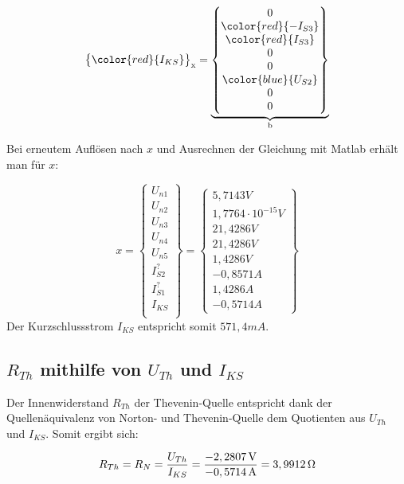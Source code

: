 \documentclass[11pt]{scrartcl}
\begin{document}
\begin{align*}
{\begin{Bmatrix}
                                                                             \color{red}{I_{KS}}
                                                                           \end{Bmatrix}}_{\text{x}} =
  \underbrace{\begin{Bmatrix}
      0 \\
      \color{red}{-I_{S3}} \\
      \color{red}{I_{S3}}\\
      0 \\
      0 \\
      \color{blue}{U_{S2}} \\
      0 \\
      0
    \end{Bmatrix}}_{\text{b}}
\end{align*}

Bei erneutem Auflösen nach $x$ und Ausrechnen der Gleichung mit Matlab erhält man für $x$:

\begin{equation*}
  x = \begin{Bmatrix}
    U_{n1} \\
    U_{n2} \\
    U_{n3} \\
    U_{n4} \\
    U_{n5} \\
    I_{S2}^? \\
    I_{S1}^? \\
    I_{KS} \\
  \end{Bmatrix} =
  \begin{Bmatrix}
    5,7143 \unit{V} \\
    1,7764 \cdot 10^{-15} \unit{V} \\
    21,4286 \unit{V} \\
    21,4286 \unit{V} \\
    1,4286 \unit{V} \\
    -0,8571 \unit{A} \\
    1,4286 \unit{A} \\
    -0,5714 \unit{A}
    \end{Bmatrix}
\end{equation*}
Der Kurzschlussstrom $I_{KS}$ entspricht somit $571,4 \unit{mA}$.

\subsection{$R_{Th}$ mithilfe von $U_{Th}$ und $I_{KS}$}
Der Innenwiderstand $R_{Th}$ der Thevenin-Quelle entspricht dank der Quellenäquivalenz von Norton- und Thevenin-Quelle
dem Quotienten aus $U_{Th}$ und $I_{KS}$.
Somit ergibt sich:

\begin{equation*}
  R_{Th} = R_N = \frac{U_{Th}}{I_{KS}} = \frac{-2,2807 \,\text{V}}{-0,5714 \,\text{A}} = 3,9912 \,\text{$\Omega$}
\end{equation*}
\end{document}
